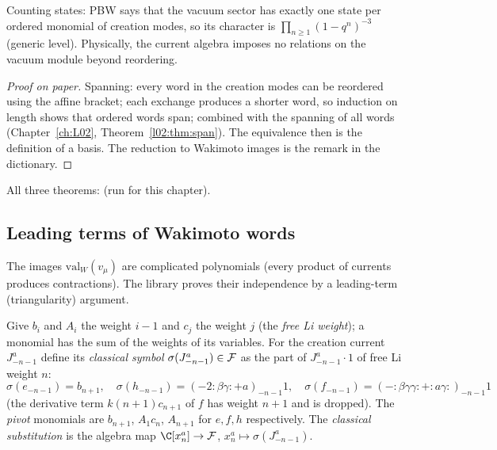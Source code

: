 \begin{physics}
Counting states: PBW says that the vacuum sector has exactly one state per ordered monomial of
creation modes, so its character is $\prod_{n\ge1}(1-q^n)^{-3}$ (generic level). Physically, the
current algebra imposes no relations on the vacuum module beyond reordering.
\end{physics}

\begin{proof}[Proof on paper]
Spanning: every word in the creation modes can be reordered using the affine bracket; each exchange
produces a shorter word, so induction on length shows that ordered words span; combined with the
spanning of all words (Chapter~\ref{ch:L02}, Theorem~\ref{l02:thm:span}). The equivalence then is the
definition of a basis. The reduction to Wakimoto images is the remark in the dictionary.
\end{proof}

\begin{status}
All three theorems: \lean{[propext, Classical.}\allowbreak{}\allowbreak\lean{sound]} (run for this chapter).
\end{status}

\subsection{Leading terms of Wakimoto words}

The images $\mathrm{val}_W(v_\mu)$ are complicated polynomials (every product of currents produces
contractions). The library proves their independence by a leading-term (triangularity) argument.

\begin{definition}\label{l08:def:classical}
Give $b_i$ and $A_i$ the weight $i-1$ and $c_j$ the weight $j$ (the \emph{free Li weight}); a monomial
has the sum of the weights of its variables. For the creation current $J^a_{-n-1}$ define its
\emph{classical symbol} $\sigma(J^a_{-n-1})\in\mathcal{F}$ as the part of $J^a_{-n-1}\cdot1$ of free
Li weight $n$:
\begin{equation*}
  \sigma(e_{-n-1}) = b_{n+1},\quad \sigma(h_{-n-1}) = (-2{:}\beta\gamma{:}+a)_{-n-1}1,\quad
  \sigma(f_{-n-1}) = (-{:}\beta\gamma\gamma{:}+{:}a\gamma{:})_{-n-1}1
\end{equation*}
(the derivative term $k(n+1)c_{n+1}$ of $f$ has weight $n+1$ and is dropped). The \emph{pivot}
monomials are $b_{n+1}$, $A_1c_n$, $A_{n+1}$ for $e,f,h$ respectively. The \emph{classical
substitution} is the algebra map $\C[x^a_n]\to\leightFock$, $x^a_n\mapsto\sigma(J^a_{-n-1})$.
\end{definition}

